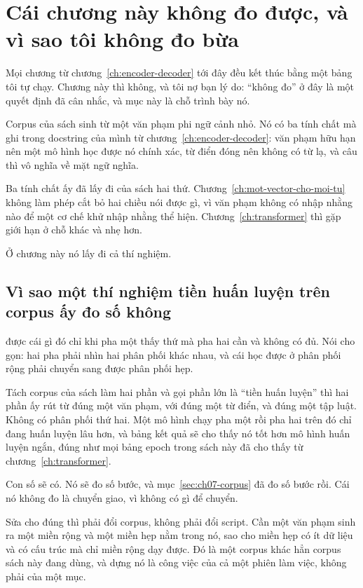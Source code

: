 \section{Cái chương này không đo được, và vì sao tôi không đo bừa}
\label{sec:ch09-khong-do-duoc}

%
Mọi chương từ chương~\ref{ch:encoder-decoder} tới đây đều kết thúc bằng một
bảng tôi tự chạy. Chương này thì không, và tôi nợ bạn lý do: \enquote{không đo}
ở đây là một quyết định đã cân nhắc, và mục này là chỗ trình bày nó.

Corpus của sách sinh từ một văn phạm phi ngữ cảnh nhỏ. Nó có ba tính chất mà
 ghi trong docstring của mình từ chương~\ref{ch:encoder-decoder}:
văn phạm hữu hạn nên một mô hình học được nó chính xác, từ điển đóng nên không
có từ lạ, và câu thì vô nghĩa về mặt ngữ nghĩa.

Ba tính chất ấy đã lấy đi của sách hai thứ. Chương~\ref{ch:mot-vector-cho-moi-tu}
không làm phép cắt bỏ hai chiều nói được gì, vì văn phạm không có nhập nhằng nào
để một cơ chế khử nhập nhằng thể hiện. Chương~\ref{ch:transformer} thì gặp giới
hạn ở chỗ khác và nhẹ hơn.

Ở chương này nó lấy đi cả thí nghiệm.

\subsection*{Vì sao một thí nghiệm tiền huấn luyện trên corpus ấy đo số không}

%
 được cái gì đó chỉ khi pha một thấy thứ mà
pha hai cần và không có đủ. Nói cho gọn: hai pha phải nhìn hai phân phối khác nhau, và cái học được
ở phân phối rộng phải chuyển sang được phân phối hẹp.

Tách corpus của sách làm hai phần và gọi phần lớn là \enquote{tiền huấn luyện}
thì hai phần ấy rút từ đúng một văn phạm, với đúng một từ điển, và đúng một tập
luật. Không có phân phối thứ hai. Một mô hình chạy pha một rồi pha hai trên đó
chỉ đang huấn luyện lâu hơn, và bảng kết quả sẽ cho thấy nó tốt hơn mô hình
huấn luyện ngắn, đúng như mọi bảng epoch trong sách này đã cho thấy từ
chương~\ref{ch:transformer}.

Con số sẽ có. Nó sẽ đo số bước, và mục~\ref{sec:ch07-corpus} đã đo số bước rồi.
Cái nó không đo là chuyển giao, vì không có gì để chuyển.

Sửa cho đúng thì phải đổi corpus, không phải đổi script. Cần một văn phạm sinh
ra một miền rộng và một miền hẹp nằm trong nó, sao cho miền hẹp có ít dữ liệu
và có cấu trúc mà chỉ miền rộng dạy được. Đó là một corpus khác hẳn corpus sách
này đang dùng, và dựng nó là công việc của cả một phiên làm việc, không phải
của một mục.

